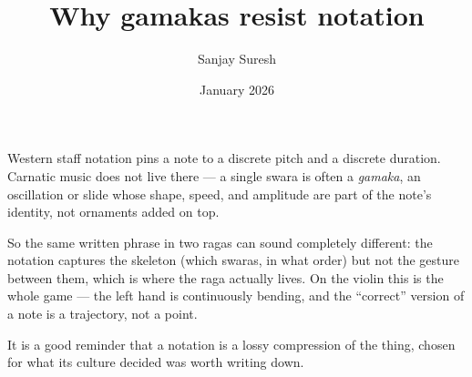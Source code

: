 \documentclass[11pt]{article}
\title{\textbf{Why gamakas resist notation}}
\author{Sanjay Suresh}
\date{January 2026}
\begin{document}
\maketitle

Western staff notation pins a note to a discrete pitch and a discrete duration. Carnatic music does
not live there --- a single swara is often a \emph{gamaka}, an oscillation or slide whose shape,
speed, and amplitude are part of the note's identity, not ornaments added on top.

So the same written phrase in two ragas can sound completely different: the notation captures the
skeleton (which swaras, in what order) but not the gesture between them, which is where the raga
actually lives. On the violin this is the whole game --- the left hand is continuously bending, and
the ``correct'' version of a note is a trajectory, not a point.

It is a good reminder that a notation is a lossy compression of the thing, chosen for what its
culture decided was worth writing down.
\end{document}
